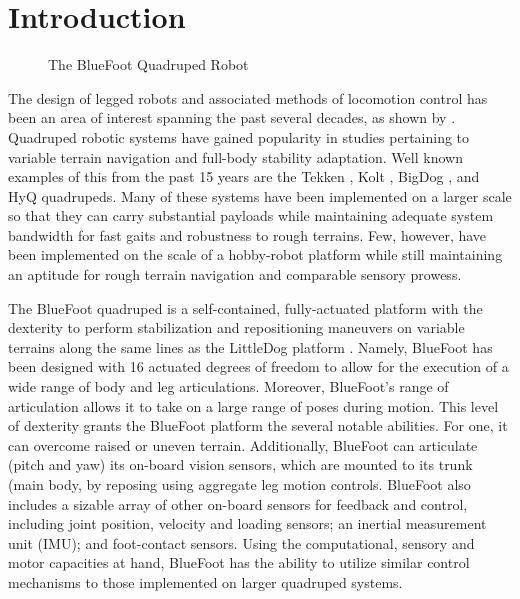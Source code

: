 \chapter{Introduction}
	\label{ch::introduction}
	
	\begin{figure}[h!]
		\centering
		\caption{The BlueFoot Quadruped Robot}
		\label{fig::bluefoot_glamour}
	\end{figure}
		The design of legged robots and associated methods of locomotion control has been an area of interest spanning the past several decades, as shown by \cite{McGhee1965,Hodgins1991,Altendorfer2001,Kolter2008,Wieber2015}. Quadruped robotic systems have gained popularity in studies pertaining to variable terrain navigation and full-body stability adaptation. Well known examples of this from the past 15 years are the Tekken \cite{Fukuoka2003}, Kolt \cite{Estremera2006}, BigDog \cite{BigDog2008}, and HyQ \cite{Semini2010_PHD} quadrupeds. Many of these systems have been implemented on a larger scale so that they can carry substantial payloads while maintaining adequate system bandwidth for fast gaits and robustness to rough terrains. Few, however, have been implemented on the scale of a hobby-robot platform while still maintaining an aptitude for rough terrain navigation and comparable sensory prowess.

		The BlueFoot quadruped is a self-contained, fully-actuated platform with the dexterity to perform stabilization and repositioning maneuvers on variable terrains along the same lines as the LittleDog platform \cite{Rebula2007}. Namely, BlueFoot has been designed with 16 actuated degrees of freedom to allow for the execution of a wide range of body and leg articulations. Moreover, BlueFoot's range of articulation allows it to take on a large range of poses during motion. This level of dexterity grants the BlueFoot platform the several notable abilities. For one, it can overcome raised or uneven terrain. Additionally, BlueFoot can articulate (\IE pitch and yaw) its on-board vision sensors, which are mounted to its trunk (main body, by reposing using aggregate leg motion controls. BlueFoot also includes a sizable array of other on-board sensors for feedback and control, including joint position, velocity and loading sensors; an inertial measurement unit (IMU); and foot-contact sensors. Using the computational, sensory and motor capacities at hand, BlueFoot has the ability to utilize similar control mechanisms to those implemented on larger quadruped systems. 

